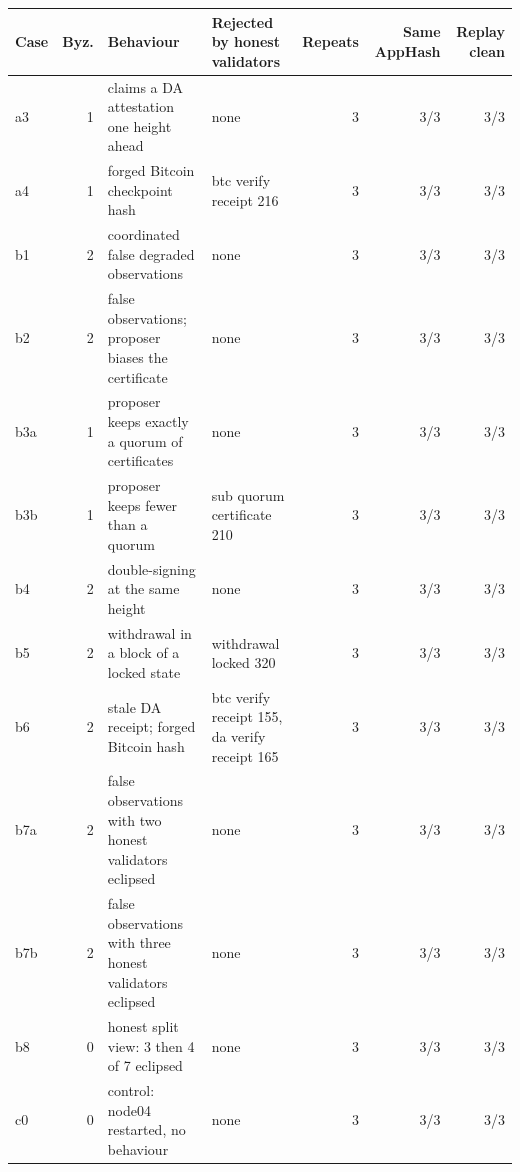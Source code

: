 \begin{tabular}{@{}lrllrrr@{}}
\toprule
\textbf{Case} & \textbf{Byz.} & \textbf{Behaviour} & \textbf{Rejected by honest validators} & \textbf{Repeats} & \textbf{Same AppHash} & \textbf{Replay clean} \\
\midrule
a3 & 1 & claims a DA attestation one height ahead & none & 3 & 3/3 & 3/3 \\
a4 & 1 & forged Bitcoin checkpoint hash & btc verify receipt 216 & 3 & 3/3 & 3/3 \\
b1 & 2 & coordinated false degraded observations & none & 3 & 3/3 & 3/3 \\
b2 & 2 & false observations; proposer biases the certificate & none & 3 & 3/3 & 3/3 \\
b3a & 1 & proposer keeps exactly a quorum of certificates & none & 3 & 3/3 & 3/3 \\
b3b & 1 & proposer keeps fewer than a quorum & sub quorum certificate 210 & 3 & 3/3 & 3/3 \\
b4 & 2 & double-signing at the same height & none & 3 & 3/3 & 3/3 \\
b5 & 2 & withdrawal in a block of a locked state & withdrawal locked 320 & 3 & 3/3 & 3/3 \\
b6 & 2 & stale DA receipt; forged Bitcoin hash & btc verify receipt 155, da verify receipt 165 & 3 & 3/3 & 3/3 \\
b7a & 2 & false observations with two honest validators eclipsed & none & 3 & 3/3 & 3/3 \\
b7b & 2 & false observations with three honest validators eclipsed & none & 3 & 3/3 & 3/3 \\
b8 & 0 & honest split view: 3 then 4 of 7 eclipsed & none & 3 & 3/3 & 3/3 \\
c0 & 0 & control: node04 restarted, no behaviour & none & 3 & 3/3 & 3/3 \\
\bottomrule
\end{tabular}

